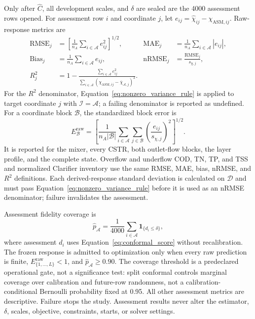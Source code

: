 \documentclass[a4paper,fleqn]{cas-sc}
\begin{document}
Only after $\widehat C$, all development scales, and $\delta$ are sealed are the 4000 assessment rows opened. For assessment row $i$ and coordinate $j$, let $e_{ij}=\widehat\chi_{ij}-\chi_{\mathrm{ASM},ij}$. Raw-response metrics are
\begin{align}
\mathrm{RMSE}_j&=\left[\frac1{n_A}\sum_{i\in\mathcal A}e_{ij}^2\right]^{1/2},
&\mathrm{MAE}_j&=\frac1{n_A}\sum_{i\in\mathcal A}|e_{ij}|,\\
\mathrm{Bias}_j&=\frac1{n_A}\sum_{i\in\mathcal A}e_{ij},
&\mathrm{nRMSE}_j&=\frac{\mathrm{RMSE}_j}{s_{\chi,j}},\\
R_j^2&=1-\frac{\sum_{i\in\mathcal A}e_{ij}^2}
{\sum_{i\in\mathcal A}(\chi_{\mathrm{ASM},ij}-\overline\chi_{\mathcal A,j})^2}.
\end{align}
For the $R^2$ denominator, Equation~\eqref{eq:nonzero_variance_rule} is applied to target coordinate $j$ with $\mathcal I=\mathcal A$; a failing denominator is reported as undefined. For a coordinate block $\mathcal B$, the standardized block error is
\begin{equation}
\label{eq:assessment_block_error}
E_{\mathcal B}^{\mathrm{raw}}=
\left[\frac1{n_A|\mathcal B|}\sum_{i\in\mathcal A}\sum_{j\in\mathcal B}
\left(\frac{e_{ij}}{s_{\chi,j}}\right)^2\right]^{1/2}.
\end{equation}
It is reported for the mixer, every CSTR, both outlet-flow blocks, the layer profile, and the complete state. Overflow and underflow COD, TN, TP, and TSS and normalized Clarifier inventory use the same RMSE, MAE, bias, nRMSE, and $R^2$ definitions. Each derived-response standard deviation is calculated on $\mathcal D$ and must pass Equation~\eqref{eq:nonzero_variance_rule} before it is used as an nRMSE denominator; failure invalidates the assessment.

Assessment fidelity coverage is
\begin{equation}
\label{eq:assessment_coverage}
\widehat p_{\mathcal A}=\frac1{4000}
\sum_{i\in\mathcal A}\mathbf1_{\{d_i\leq\delta\}},
\end{equation}
where assessment $d_i$ uses Equation~\eqref{eq:conformal_score} without recalibration. The frozen response is admitted to optimization only when every raw prediction is finite, $E_{\{1,\ldots,L\}}^{\mathrm{raw}}<1$, and $\widehat p_{\mathcal A}\geq0.90$. The coverage threshold is a predeclared operational gate, not a significance test: split conformal controls marginal coverage over calibration and future-row randomness, not a calibration-conditional Bernoulli probability fixed at 0.95. All other assessment metrics are descriptive. Failure stops the study. Assessment results never alter the estimator, $\delta$, scales, objective, constraints, starts, or solver settings.
\end{document}
